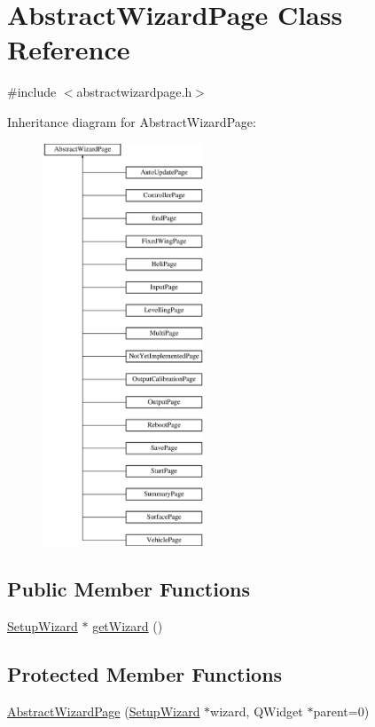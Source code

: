 \hypertarget{class_abstract_wizard_page}{\section{\-Abstract\-Wizard\-Page \-Class \-Reference}
\label{class_abstract_wizard_page}
}


{\ttfamily \#include $<$abstractwizardpage.\-h$>$}

\-Inheritance diagram for \-Abstract\-Wizard\-Page\-:\begin{figure}[H]
\begin{center}
\leavevmode
\includegraphics[height=12.000000cm]{class_abstract_wizard_page}
\end{center}
\end{figure}
\subsection*{\-Public \-Member \-Functions}
\begin{DoxyCompactItemize}
\item 
\hyperlink{class_setup_wizard}{\-Setup\-Wizard} $\ast$ \hyperlink{group___abstract_wizard_page_ga3b642a9ee89ee028e4f6f9a2b225abc8}{get\-Wizard} ()
\end{DoxyCompactItemize}
\subsection*{\-Protected \-Member \-Functions}
\begin{DoxyCompactItemize}
\item 
\hyperlink{group___abstract_wizard_page_ga3400bbb9976ac60b51a4afaff47df806}{\-Abstract\-Wizard\-Page} (\hyperlink{class_setup_wizard}{\-Setup\-Wizard} $\ast$wizard, \-Q\-Widget $\ast$parent=0)
\end{DoxyCompactItemize}


